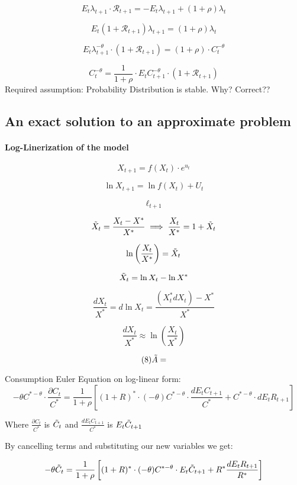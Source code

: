 $$
E_t \lambda_{t+1} \cdot \mathcal{R}_{t+1} = - E_t \lambda_{t+1} + (1 + \rho) \lambda_t
$$

$$
E_t (1 + \mathcal{R}_{t+1}) \lambda_{t +1} = ( 1 + \rho) \lambda_{t}
$$


$$
E_t \lambda_{t +1}^{- \theta} \cdot (1 + \mathcal{R}_{t +1}) = (1 + \rho ) \cdot C_t^{- \theta}
$$


$$
C_t^{- \theta} = \frac{1}{1 + \rho} \cdot E_t C_{t + 1}^{- \theta} \cdot (1 + \mathcal{R}_{t +1})
$$
Required assumption: Probability Distribution is stable. Why?
Correct??



\subsection{An exact solution to an approximate problem}
\paragraph{Log-Linerization of the model}
$$
X_{t+1} = f (X_t) \cdot e^{u_t}
$$

$$
\ln X_{t+1} = \ln f(X_t) + U_t
$$

$$
\ell_{t+1}
$$

$$
\Tilde{X}_{t} = \frac{X_t - X^*}{X^*} \implies \frac{X_t}{X^*} = 1 + \Tilde{X}_{t}
$$

$$
\ln \left( \frac{X_t}{X^*} \right) =  \Tilde{X}_{t}
$$

$$
\Tilde{X}_{t} = \ln X_t - \ln X^*
$$

$$
\frac{dX_t}{X^*} = d\ln X_t = \frac{(X_t^* dX_{t}) - X^*}{X^*}
$$

$$
\frac{dX_t}{X^*} \approx  \ln \left( \frac{X_t}{X^*} \right)
$$

$$
(8) \Tilde{A} = 
$$

Consumption Euler Equation on log-linear form:
$$
- \theta C^{* - \theta} \cdot \frac{\partial C_t}{C^*} = \frac{1}{1 + \rho} \left[ (1 + R)^* \cdot (- \theta) C^{* - \theta} \cdot \frac{d E_t C_{t+1}}{C^*} + C^{* - \theta} \cdot d E_t R_{t+1}   \right]
$$

Where $\frac{\partial C_t}{C^*}$ is $\Tilde{C}_t$ and $\frac{d E_t C_{t+1}}{C^*}$ is $E_t\Tilde{C}_{t+1}$

By cancelling terms and substituting our new variables we get:

\begin{equation}
- \theta \Tilde{C}_t = \frac{1}{1 + \rho} \left[ (1 + R)^* \cdot (- \theta) C^{* - \theta} \cdot E_t\Tilde{C}_{t+1} + R^*  \frac{d E_t R_{t+1}}{R^*}   \right]
\end{equation}

